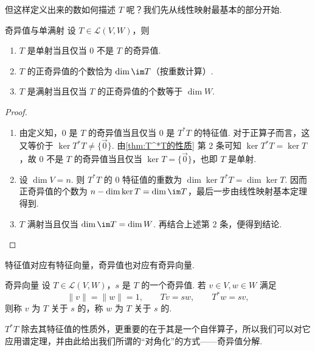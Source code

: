 但这样定义出来的数如何描述 $T$ 呢？我们先从线性映射最基本的部分开始.

\begin{theorem}{}{奇异值与单满射}
    设 $T \in \mathcal{L}(V, W)$，则
    \begin{enumerate}
        \item $T$ 是单射当且仅当 $0$ 不是 $T$ 的奇异值.

        \item $T$ 的正奇异值的个数恰为 $\dim \im T$（按重数计算）.

        \item $T$ 是满射当且仅当 $T$ 的正奇异值的个数等于 $\dim W$.
    \end{enumerate}
\end{theorem}

\begin{proof}
    \begin{enumerate}
        \item 由定义知，$0$ 是 $T$ 的奇异值当且仅当 $0$ 是 $T^*T$ 的特征值. 对于正算子而言，这又等价于 $\ker T^*T \neq \{\vec{0}\}$. 由\autoref{thm:T^*T的性质} 第 2 条可知 $\ker T^*T = \ker T$，故 $0$ 不是 $T$ 的奇异值当且仅当 $\ker T = \{\vec{0}\}$，也即 $T$ 是单射.

        \item 设 $\dim V = n$. 则 $T^*T$ 的 $0$ 特征值的重数为 $\dim \ker T^*T = \dim \ker T$. 因而正奇异值的个数为 $n - \dim \ker T = \dim \im T$，最后一步由线性映射基本定理得到.

        \item $T$ 满射当且仅当 $\dim \im T = \dim W$. 再结合上述第 2 条，便得到结论.
    \end{enumerate}
\end{proof}

特征值对应有特征向量，奇异值也对应有奇异向量.

\begin{definition}{奇异向量}{} 
    设 $T \in \mathcal{L}(V, W)$，$s$ 是 $T$ 的一个奇异值. 若 $v \in V, w \in W$ 满足
    \[
        \lVert v \rVert = \lVert w \rVert = 1,\qquad Tv = sw,\qquad T^*w = sv,
    \]
    则称 $v$ 为 $T$ 关于 $s$ 的，称 $w$ 为 $T$ 关于 $s$ 的.
\end{definition}

$T^*T$ 除去其特征值的性质外，更重要的在于其是一个自伴算子，所以我们可以对它应用谱定理，并由此给出我们所谓的``对角化''的方式——奇异值分解.

